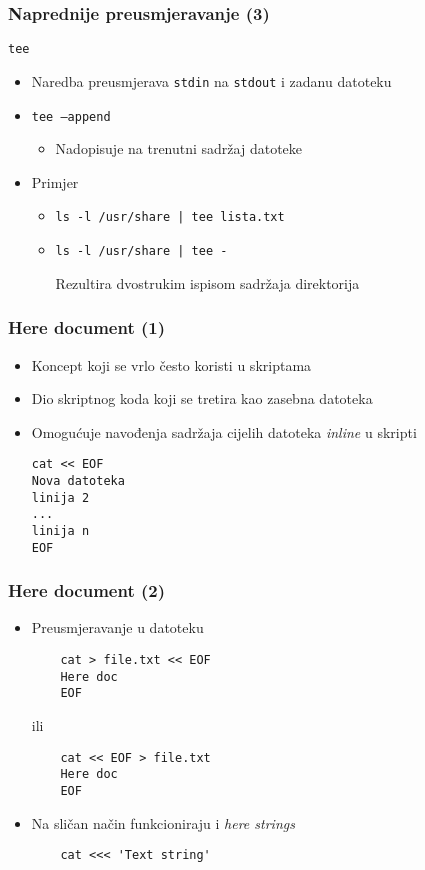 \documentclass{beamer}
\newcommand{\shell}[1]{\texttt{#1}}
\begin{document}
\begin{frame}[t]
\frametitle{Naprednije preusmjeravanje (3)}
\shell{tee}
\begin{itemize}
	\item Naredba preusmjerava \shell{stdin} na \shell{stdout} i zadanu datoteku
	\item \shell{tee --append}
	\begin{itemize}
		\item Nadopisuje na trenutni sadržaj datoteke
	\end{itemize}
\end{itemize}
\begin{itemize}
	\item Primjer
	\begin{itemize}
		\item \shell{ls -l /usr/share | tee lista.txt}
		\item \shell{ls -l /usr/share | tee -}
		\item[] {\footnotesize Rezultira dvostrukim ispisom sadržaja direktorija}
	\end{itemize}
\end{itemize}
\end{frame}

\begin{frame}[fragile]
\frametitle{Here document (1)}
\begin{itemize}
	\item Koncept koji se vrlo često koristi u skriptama
	\item Dio skriptnog koda koji se tretira kao zasebna datoteka
	\item Omogućuje navođenja sadržaja cijelih datoteka \textit{inline} u skripti
\end{itemize}
\begin{itemize}
\item[] \begin{verbatim}
cat << EOF
Nova datoteka
linija 2
...
linija n
EOF
\end{verbatim}
\end{itemize}
\end{frame}

\begin{frame}[fragile]
\frametitle{Here document (2)}
\begin{itemize}
	\item Preusmjeravanje u datoteku
	\item[] \begin{verbatim}
	cat > file.txt << EOF
	Here doc
	EOF
	\end{verbatim}
	\item[ili] \begin{verbatim}
	cat << EOF > file.txt
	Here doc
	EOF
	\end{verbatim}
\end{itemize}
\begin{itemize}
	\item Na sličan način funkcioniraju i \textit{here strings}
	\item[] \begin{verbatim}
	cat <<< 'Text string'
	\end{verbatim}
\end{itemize}
\end{frame}
\end{document}
